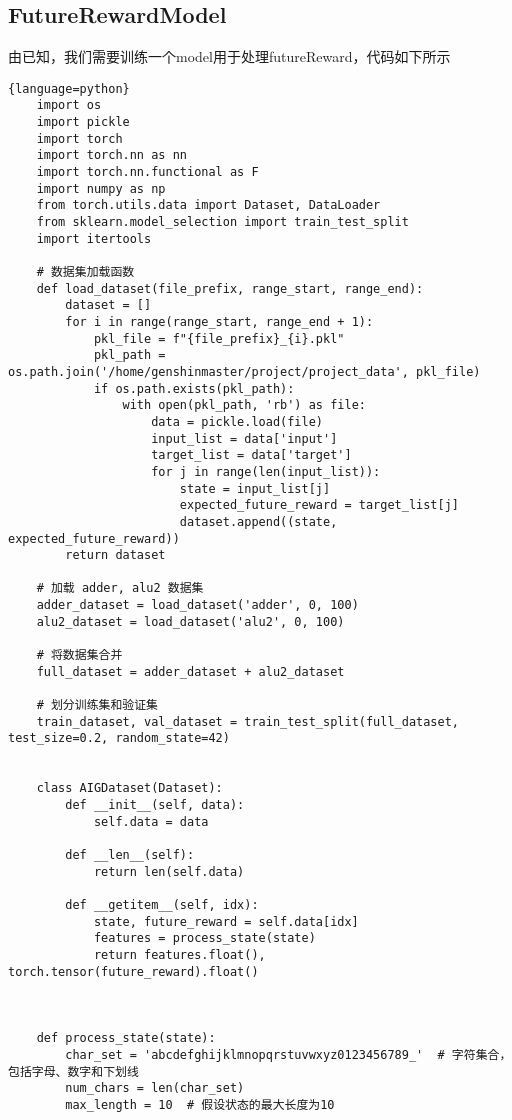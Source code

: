 \documentclass[UTF8]{ctexart}
\begin{document}
\subsection{FutureRewardModel}
由已知，我们需要训练一个model用于处理futureReward，代码如下所示
\begin{lstlisting}{language=python}
    import os
    import pickle
    import torch
    import torch.nn as nn
    import torch.nn.functional as F
    import numpy as np
    from torch.utils.data import Dataset, DataLoader
    from sklearn.model_selection import train_test_split
    import itertools
    
    # 数据集加载函数
    def load_dataset(file_prefix, range_start, range_end):
        dataset = []
        for i in range(range_start, range_end + 1):
            pkl_file = f"{file_prefix}_{i}.pkl"
            pkl_path = os.path.join('/home/genshinmaster/project/project_data', pkl_file)
            if os.path.exists(pkl_path):
                with open(pkl_path, 'rb') as file:
                    data = pickle.load(file)
                    input_list = data['input']
                    target_list = data['target']
                    for j in range(len(input_list)):
                        state = input_list[j]
                        expected_future_reward = target_list[j]
                        dataset.append((state, expected_future_reward))
        return dataset
    
    # 加载 adder, alu2 数据集
    adder_dataset = load_dataset('adder', 0, 100)
    alu2_dataset = load_dataset('alu2', 0, 100)
    
    # 将数据集合并
    full_dataset = adder_dataset + alu2_dataset
    
    # 划分训练集和验证集
    train_dataset, val_dataset = train_test_split(full_dataset, test_size=0.2, random_state=42)
    
    
    class AIGDataset(Dataset):
        def __init__(self, data):
            self.data = data
    
        def __len__(self):
            return len(self.data)
    
        def __getitem__(self, idx):
            state, future_reward = self.data[idx]
            features = process_state(state)
            return features.float(), torch.tensor(future_reward).float()
    
    
    
    def process_state(state):
        char_set = 'abcdefghijklmnopqrstuvwxyz0123456789_'  # 字符集合，包括字母、数字和下划线
        num_chars = len(char_set)
        max_length = 10  # 假设状态的最大长度为10
    

\end{lstlisting}
\end{document}
